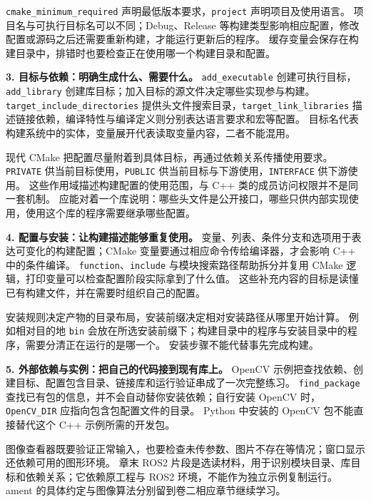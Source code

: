 \texttt{cmake\_minimum\_required} 声明最低版本要求，\texttt{project} 声明项目及使用语言。
项目名与可执行目标名可以不同；Debug、Release 等构建类型影响相应配置，修改配置或源码之后还需要重新构建，才能运行更新后的程序。
缓存变量会保存在构建目录中，排错时也要检查正在使用哪一个构建目录和配置。

\textbf{3. 目标与依赖：明确生成什么、需要什么。}
\texttt{add\_executable} 创建可执行目标，\texttt{add\_library} 创建库目标；加入目标的源文件决定哪些实现参与构建。
\texttt{target\_include\_directories} 提供头文件搜索目录，\texttt{target\_link\_libraries} 描述链接依赖，编译特性与编译定义则分别表达语言要求和宏等配置。
目标名代表构建系统中的实体，变量展开代表读取变量内容，二者不能混用。

现代 CMake 把配置尽量附着到具体目标，再通过依赖关系传播使用要求。
\texttt{PRIVATE} 供当前目标使用，\texttt{PUBLIC} 供当前目标与下游使用，\texttt{INTERFACE} 供下游使用。
这些作用域描述构建配置的使用范围，与 C++ 类的成员访问权限并不是同一套机制。
应能对着一个库说明：哪些头文件是公开接口，哪些只供内部实现使用，使用这个库的程序需要继承哪些配置。

\textbf{4. 配置与安装：让构建描述能够重复使用。}
变量、列表、条件分支和选项用于表达可变化的构建配置；CMake 变量要通过相应命令传给编译器，才会影响 C++ 中的条件编译。
\texttt{function}、\texttt{include} 与模块搜索路径帮助拆分并复用 CMake 逻辑，打印变量可以检查配置阶段实际拿到了什么值。
这些补充内容的目标是读懂已有构建文件，并在需要时组织自己的配置。

安装规则决定产物的目录布局，安装前缀决定相对安装路径从哪里开始计算。
例如相对目的地 \texttt{bin} 会放在所选安装前缀下；构建目录中的程序与安装目录中的程序，需要分清正在运行的是哪一个。
安装步骤不能代替事先完成构建。

\textbf{5. 外部依赖与实例：把自己的代码接到现有库上。}
OpenCV 示例把查找依赖、创建目标、配置包含目录、链接库和运行验证串成了一次完整练习。
\texttt{find\_package} 查找已有包的信息，并不会自动替你安装依赖；自行安装 OpenCV 时，\texttt{OpenCV\_DIR} 应指向包含包配置文件的目录。
Python 中安装的 OpenCV 包不能直接替代这个 C++ 示例所需的开发包。

图像查看器既要验证正常输入，也要检查未传参数、图片不存在等情况；窗口显示还依赖可用的图形环境。
章末 ROS2 片段是选读材料，用于识别模块目录、库目标和依赖关系；它依赖原工程与 ROS2 环境，不能作为独立示例复制运行。
ament 的具体约定与图像算法分别留到卷二相应章节继续学习。

